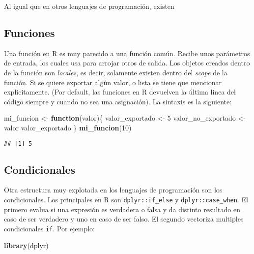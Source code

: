 \documentclass[]{book}
\newenvironment{Shaded}{\begin{snugshade}}{\end{snugshade}}
\newcommand{\ControlFlowTok}[1]{\textcolor[rgb]{0.13,0.29,0.53}{\textbf{#1}}}
\newcommand{\DecValTok}[1]{\textcolor[rgb]{0.00,0.00,0.81}{#1}}
\newcommand{\KeywordTok}[1]{\textcolor[rgb]{0.13,0.29,0.53}{\textbf{#1}}}
\newcommand{\NormalTok}[1]{#1}
\newcommand{\StringTok}[1]{\textcolor[rgb]{0.31,0.60,0.02}{#1}}
\begin{document}
Al igual que en otros lenguajes de programación, existen

\hypertarget{funciones}{%
\subsection{Funciones}\label{funciones}}

Una función en R es muy parecido a una función común. Recibe unos parámetros de entrada, los cuales usa para arrojar otros de salida. Los objetos creados dentro de la función son \emph{locales}, es decir, solamente existen dentro del \emph{scope} de la función. Si se quiere exportar algún valor, o lista se tiene que mencionar explicitamente. (Por default, las funciones en R devuelven la última linea del código siempre y cuando no sea una asignación). La sintaxis es la siguiente:

\begin{Shaded}
\begin{Highlighting}[]
\NormalTok{ mi_funcion <-}\StringTok{ }\ControlFlowTok{function}\NormalTok{(valor)\{}
\NormalTok{   valor_exportado <-}\StringTok{ }\DecValTok{5}
\NormalTok{   valor_no_exportado <-}\StringTok{ }\NormalTok{valor}
\NormalTok{   valor_exportado}
\NormalTok{ \}}
 \KeywordTok{mi_funcion}\NormalTok{(}\DecValTok{10}\NormalTok{)}
\end{Highlighting}
\end{Shaded}

\begin{verbatim}
## [1] 5
\end{verbatim}

\hypertarget{condicionales}{%
\subsection{Condicionales}\label{condicionales}}

Otra estructura muy explotada en los lenguajes de programación son los condicionales. Los principales en R son \texttt{dplyr::if\_else} y \texttt{dplyr::case\_when}. El primero evalua si una expresión es verdadera o falsa y da distinto resultado en caso de ser verdadero y uno en caso de ser falso. El segundo vectoriza multiples condicionales \texttt{if}. Por ejemplo:

\begin{Shaded}
\begin{Highlighting}[]
\KeywordTok{library}\NormalTok{(dplyr)}
\end{Highlighting}
\end{Shaded}
\end{document}
